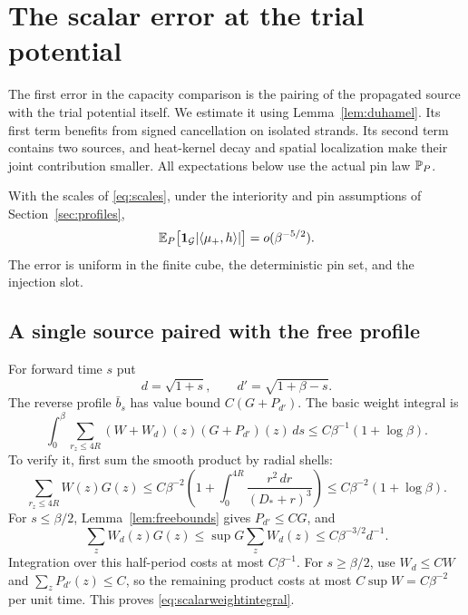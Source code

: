 \section{The scalar error at the trial potential}\label{sec:scalar}

The first error in the capacity comparison is the pairing of the
propagated source with the trial potential itself.  We estimate it
using Lemma~\ref{lem:duhamel}.  Its first term benefits from signed
cancellation on isolated strands.  Its second term contains two
sources, and heat-kernel decay and spatial localization make their
joint contribution smaller.  All expectations below use the actual
pin law $\mathbb P_P$.

\begin{proposition}\label{prop:scalar}
With the scales of \eqref{eq:scales}, under the interiority and pin
assumptions of Section~\ref{sec:profiles},
\begin{equation}\label{eq:scalarclaim}
 \mathbb E_P\bigl[\mathbf 1_{\mathcal G}|\langle \mu_+,h\rangle|\bigr]
                         =o(\beta^{-5/2}).
\end{equation}
The error is uniform in the finite cube, the deterministic pin set,
and the injection slot.
\end{proposition}

\subsection{A single source paired with the free profile}

For forward time $s$ put
\[
 d=\sqrt{1+s},\qquad d'=\sqrt{1+\beta-s}.
\]
The reverse profile $\bar b_s$ has value bound $C(G+P_{d'})$.
The basic weight integral is
\begin{equation}\label{eq:scalarweightintegral}
 \int_0^\beta\sum_{r_z\le4R}
       (W+W_d)(z)(G+P_{d'})(z)\,ds
                  \le C\beta^{-1}(1+\log\beta).
\end{equation}
To verify it, first sum the smooth product by radial shells:
\[
 \sum_{r_z\le4R}W(z)G(z)
 \le C\beta^{-2}
       \left(1+\int_0^{4R}\frac{r^2\,dr}{(D_*+r)^3}\right)
 \le C\beta^{-2}(1+\log\beta).
\]
For $s\le\beta/2$, Lemma~\ref{lem:freebounds} gives $P_{d'}\le CG$,
and
\[
 \sum_z W_d(z)G(z)
 \le \sup G\sum_z W_d(z)\le C\beta^{-3/2}d^{-1}.
\]
Integration over this half-period costs at most $C\beta^{-1}$.
For $s\ge\beta/2$, use $W_d\le CW$ and
$\sum_zP_{d'}(z)\le C$, so the remaining product costs at most
$C\sup W=C\beta^{-2}$ per unit time.  This proves
\eqref{eq:scalarweightintegral}.

